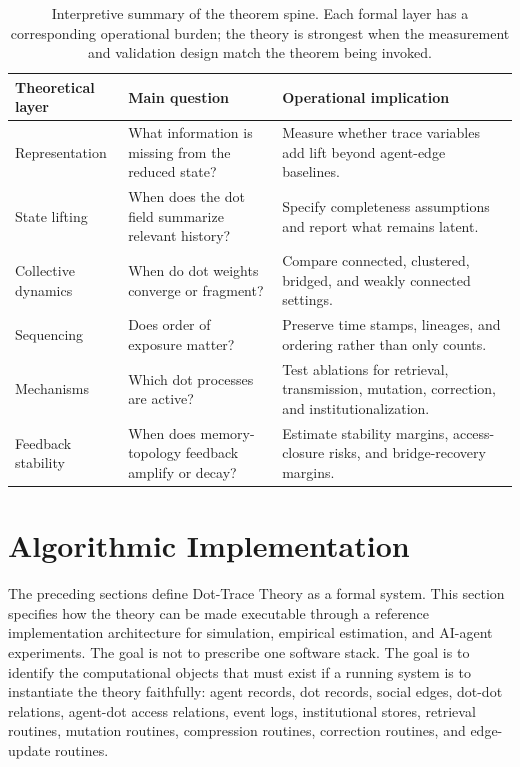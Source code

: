 \documentclass[11pt]{article}
\theoremstyle{remark}
\begin{document}
\begin{table}[htbp]
\centering
\small
\begin{tabular}{L{0.20\textwidth}L{0.38\textwidth}L{0.34\textwidth}}
\toprule
\textbf{Theoretical layer} & \textbf{Main question} & \textbf{Operational implication}\\
\midrule
Representation & What information is missing from the reduced state? & Measure whether trace variables add lift beyond agent-edge baselines.\\
State lifting & When does the dot field summarize relevant history? & Specify completeness assumptions and report what remains latent.\\
Collective dynamics & When do dot weights converge or fragment? & Compare connected, clustered, bridged, and weakly connected settings.\\
Sequencing & Does order of exposure matter? & Preserve time stamps, lineages, and ordering rather than only counts.\\
Mechanisms & Which dot processes are active? & Test ablations for retrieval, transmission, mutation, correction, and institutionalization.\\
Feedback stability & When does memory-topology feedback amplify or decay? & Estimate stability margins, access-closure risks, and bridge-recovery margins.\\
\bottomrule
\end{tabular}
\caption{Interpretive summary of the theorem spine. Each formal layer has a corresponding operational burden; the theory is strongest when the measurement and validation design match the theorem being invoked.}
\label{tab:theoretical-spine-synthesis}
\end{table}

\section{Algorithmic Implementation}\label{algorithmic-implementation}

The preceding sections define Dot-Trace Theory as a formal system. This section specifies how the theory can be made executable through a reference implementation architecture for simulation, empirical estimation, and AI-agent experiments. The goal is not to prescribe one
software stack. The goal is to identify the computational objects that
must exist if a running system is to instantiate the theory faithfully:
agent records, dot records, social edges, dot-dot relations, agent-dot
access relations, event logs, institutional stores, retrieval routines,
mutation routines, compression routines, correction routines, and
edge-update routines.
\end{document}
